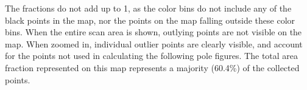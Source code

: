 %	
%		
%
%
%	
%		
%		
%		
%		
%		
%
The fractions do not add up to 1, as the color bins do not include any of the black points in the map, nor the points on the map falling outside these color bins. When the entire scan area is shown, outlying points are not visible on the map. When zoomed in, individual outlier points are clearly visible, and account for the points not used in calculating the following pole figures. The total area fraction represented on this map represents a  majority (60.4\%) of the collected points.


